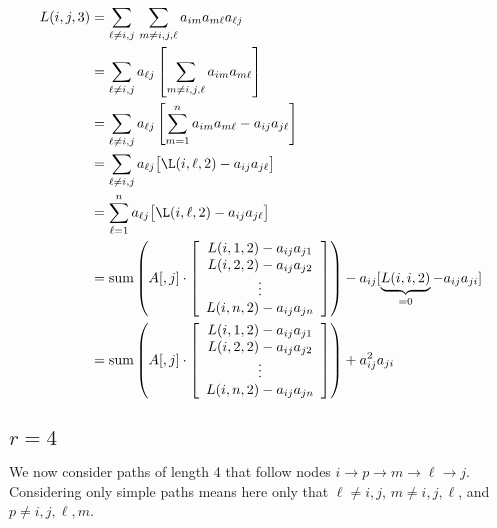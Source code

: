 \documentclass[11pt]{article} %
\begin{document}
\begin{align}
  L(i,j,3) &= \sum_{\ell \neq i,j} \, \sum_{m\neq i,j,\ell} a_{im} a_{m\ell} a_{\ell j} \\
           &= \sum_{\ell \neq i,j} a_{\ell j} \left[ \sum_{m\neq i,j,\ell} a_{im} a_{m\ell} \right] \\
           &= \sum_{\ell \neq i,j} a_{\ell j} \left[ \sum_{m=1}^n a_{im} a_{m\ell} - a_{ij}a_{j\ell} \right] \\
           &= \sum_{\ell \neq i,j} a_{\ell j} \bigl[ \L(i,\ell,2) - a_{ij}a_{j\ell} \bigr] \\
           &= \sum_{\ell=1}^n a_{\ell j} \bigl[ \L(i,\ell,2) - a_{ij}a_{j\ell} \bigr] \\
           &= \text{sum} \left( A[,j] \cdot \left[ \begin{array}{c}L(i,1,2) - a_{ij}a_{j1} \\ L(i,2,2) - a_{ij}a_{j2} \\ \vdots \\ L(i,n,2) - a_{ij}a_{jn} \end{array} \right] \right) - a_{ij}[\underbrace{L(i,i,2)}_{=0}-a_{ij}a_{ji}] \\
           &= \text{sum} \left( A[,j] \cdot \left[ \begin{array}{c}L(i,1,2) - a_{ij}a_{j1} \\ L(i,2,2) - a_{ij}a_{j2} \\ \vdots \\ L(i,n,2) - a_{ij}a_{jn} \end{array} \right] \right) + a_{ij}^2 a_{ji}
\end{align}

\newpage
\subsection{$r=4$}
We now consider paths of length 4 that follow nodes $i \to p \to m \to \ell \to j$.  Considering only simple paths means here only that $\ell\neq i,j$, $m\neq i,j,\ell$, and $p\neq i,j,\ell,m$.
\end{document}
